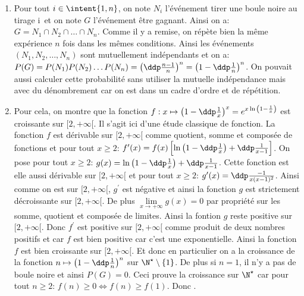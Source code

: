 \begin{correction}   \;
\begin{enumerate}
\item Pour tout $i\in\intent{ 1,n}$, on note $N_i$ l'\'ev\'enement \og tirer une boule noire au tirage i\fg \, et on note $G$ l'\'ev\'enement \og \^{e}tre gagnant\fg. Ainsi on a: $G=N_1\cap N_2\cap \dots\cap N_n$. Comme il y a remise, on r\'ep\`ete bien la m\^{e}me exp\'erience $n$ fois dans les m\^{e}mes conditions. Ainsi les \'ev\'enements $(N_1,N_2,\dots, N_n)$ sont mutuellement ind\'ependants et on a: $P(G)=P(N_1)P(N_2)\dots P(N_n)=\left( \ddp\frac{n-1}{n} \right)^n=\left(1- \ddp\frac{1}{n} \right)^n$. On pouvait aussi calculer cette probabilit\'e sans utiliser la mutuelle ind\'ependance mais avec du d\'enombrement car on est dans un cadre d'ordre et de r\'ep\'etition.
\item Pour cela, on montre que la fonction $f: x\mapsto \left( 1-\ddp\frac{1}{x} \right)^x=e^{x\ln{\left( 1-\frac{1}{x}  \right)}}$ est croissante sur $\lbrack 2,+\infty\lbrack$. Il s'agit ici d'une \'etude classique de fonction. La fonction $f$ est d\'erivable sur $\lbrack 2,+\infty\lbrack$ comme quotient, somme et compos\'ee de fonctions et pour tout $x\geq 2$: $f^{\prime}(x)=f(x)\left\lbrack  \ln{\left( 1-\ddp\frac{1}{x}  \right)} +\ddp\frac{1}{x-1}\right\rbrack$. On pose pour tout $x\geq 2$: $g(x)= \ln{\left( 1-\ddp\frac{1}{x}  \right)} +\ddp\frac{1}{x-1}$. Cette fonction est elle aussi d\'erivable sur $\lbrack 2,+\infty\lbrack$ et pour tout $x\geq 2$: $g^{\prime}(x)=\ddp\frac{-1}{x(x-1)^2}$. Ainsi comme on est sur $\lbrack 2,+\infty\lbrack$, $g^{\prime}$ est n\'egative et ainsi la fonction $g$ est strictement d\'ecroissante sur $\lbrack 2,+\infty\lbrack$. De plus $\lim\limits_{x\to +\infty} g(x)=0$ par propri\'et\'e sur les somme, quotient et compos\'ee de limites. Ainsi la fontion $g$ reste positive sur $\lbrack 2,+\infty\lbrack$. Donc $f^{\prime}$ est positive sur $\lbrack 2,+\infty\lbrack$ comme produit de deux nombres positifs et car $f$ est bien positive car c'est une exponentielle. Ainsi la fonction $f$ est bien croissante sur $\lbrack 2,+\infty\lbrack$. Et donc en particulier on a la croissance de la fonction $n\mapsto \left(1- \ddp\frac{1}{n} \right)^n$ sur $\N^{\star}\setminus\lbrace 1\rbrace$. De plus si $n=1$, il n'y a pas de boule noire et ainsi $P(G)=0$. Ceci prouve la croissance sur $\N^{\star}$ car pour tout $n\geq 2$: $f(n)\geq 0\Leftrightarrow f(n)\geq f(1)$. Donc .

\end{enumerate}
\end{correction}
